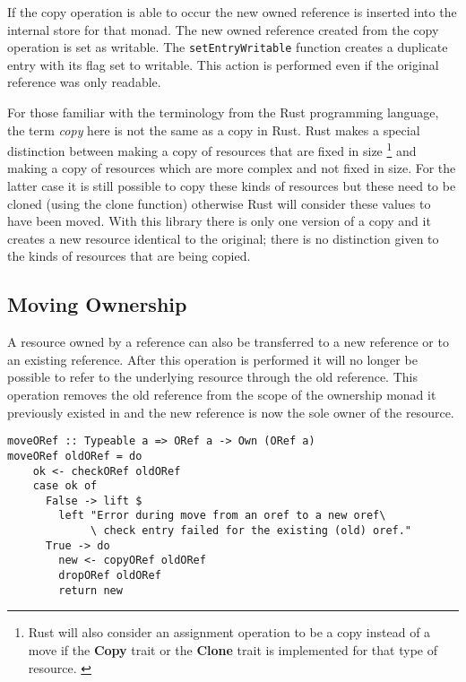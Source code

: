 \documentclass[onehalf,11pt]{beavtex}
\begin{document}
If the copy operation is able to occur the new owned reference is inserted into
the internal store for that monad.  The new owned reference created from the copy
operation is set as writable. The \texttt{setEntryWritable} function
creates a duplicate entry with its flag set to writable.
This action is performed even if the original reference was only
readable.

For those familiar with the terminology from the Rust programming language, the
term \textit{copy} here is not the same as a copy in Rust. Rust makes a special
distinction between making a copy of resources that are fixed in size
\footnote{Rust will also consider an assignment operation to be a copy instead
  of a move if the \textbf{Copy} trait or the \textbf{Clone} trait is
  implemented for that type of resource. \cite{rust_book_traits}
  \cite{rust_docs_clone_trait}}
and making a copy of resources which are more complex and not fixed in size.
For the latter case it is still possible to copy these kinds of resources but these
need to be cloned (using the clone function) otherwise Rust will consider these
values to have been moved. \cite{rust_book_ownership}
With this library there is only one version of a copy and it creates a new
resource identical to the original; there is no distinction given to the kinds
of resources that are being copied.

\subsection{Moving Ownership}

A resource owned by a reference can also be transferred to a new reference or
to an existing reference. After this operation is performed it will no longer
be possible to refer to the underlying resource through the old reference. This
operation removes the old reference from the scope of the ownership monad it
previously existed in and the new reference is now the sole owner of the
resource.

\begin{verbatim}
moveORef :: Typeable a => ORef a -> Own (ORef a)
moveORef oldORef = do
    ok <- checkORef oldORef
    case ok of
      False -> lift $
        left "Error during move from an oref to a new oref\
             \ check entry failed for the existing (old) oref."
      True -> do
        new <- copyORef oldORef
        dropORef oldORef
        return new
\end{verbatim}
\end{document}
